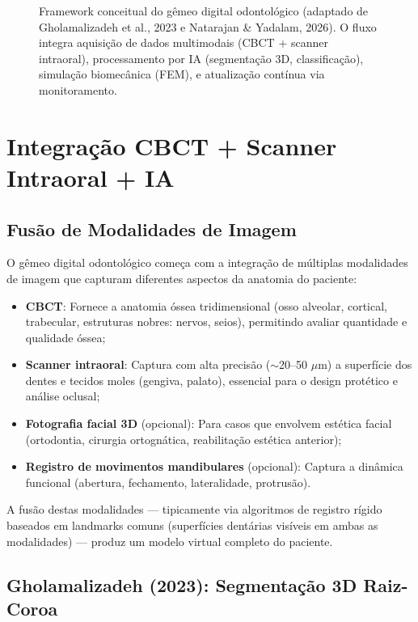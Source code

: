 \begin{figure}[H]
\caption{Framework conceitual do gêmeo digital odontológico (adaptado de Gholamalizadeh et al., 2023 e Natarajan \& Yadalam, 2026). O fluxo integra aquisição de dados multimodais (CBCT + scanner intraoral), processamento por IA (segmentação 3D, classificação), simulação biomecânica (FEM), e atualização contínua via monitoramento.}
\label{fig:digital-twin-framework}
\end{figure}


\section{Integração CBCT + Scanner Intraoral + IA}

\subsection{Fusão de Modalidades de Imagem}

O gêmeo digital odontológico começa com a integração de múltiplas modalidades de imagem que capturam diferentes aspectos da anatomia do paciente:
\begin{itemize}
    \item \textbf{CBCT}: Fornece a anatomia óssea tridimensional (osso alveolar, cortical, trabecular, estruturas nobres: nervos, seios), permitindo avaliar quantidade e qualidade óssea;
    \item \textbf{Scanner intraoral}: Captura com alta precisão ($\sim$20--50 $\mu$m) a superfície dos dentes e tecidos moles (gengiva, palato), essencial para o design protético e análise oclusal;
    \item \textbf{Fotografia facial 3D} (opcional): Para casos que envolvem estética facial (ortodontia, cirurgia ortognática, reabilitação estética anterior);
    \item \textbf{Registro de movimentos mandibulares} (opcional): Captura a dinâmica funcional (abertura, fechamento, lateralidade, protrusão).
\end{itemize}

A fusão destas modalidades --- tipicamente via algoritmos de registro rígido baseados em landmarks comuns (superfícies dentárias visíveis em ambas as modalidades) --- produz um modelo virtual completo do paciente.

\subsection{Gholamalizadeh (2023): Segmentação 3D Raiz-Coroa}

